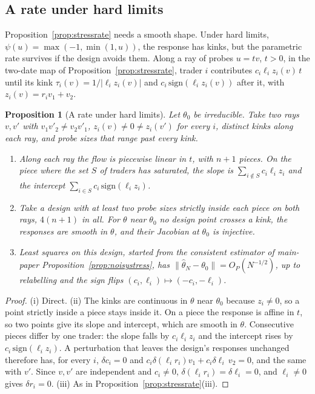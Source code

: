 \documentclass[12pt]{article}
\newtheorem{proposition}[theorem]{Proposition}
\theoremstyle{definition}
\theoremstyle{remark}
\begin{document}
\subsection{A rate under hard limits}

Proposition~\ref{prop:stressrate} needs a smooth shape. Under hard limits, $\psi(u)=\max(-1,\min(1,u))$, the response has kinks, but the parametric rate survives if the design avoids them. Along a ray of probes $u=tv$, $t>0$, in the two-date map of Proposition~\ref{prop:stressrate}, trader $i$ contributes $c_i\ell_iz_i(v)\,t$ until its kink $\tau_i(v)=1/|\ell_iz_i(v)|$ and $c_i\,\mathrm{sign}(\ell_iz_i(v))$ after it, with $z_i(v)=r_iv_1+v_2$.

\begin{proposition}[A rate under hard limits]\label{prop:hardrate}
Let $\theta_0$ be irreducible. Take two rays $v,v'$ with $v_1v'_2\ne v_2v'_1$, $z_i(v)\ne0\ne z_i(v')$ for every $i$, distinct kinks along each ray, and probe sizes that range past every kink.
\begin{enumerate}[label=(\roman*),itemsep=1pt]
\item Along each ray the flow is piecewise linear in $t$, with $n+1$ pieces. On the piece where the set $S$ of traders has saturated, the slope is $\sum_{i\notin S}c_i\ell_iz_i$ and the intercept $\sum_{i\in S}c_i\,\mathrm{sign}(\ell_iz_i)$.
\item Take a design with at least two probe sizes strictly inside each piece on both rays, $4(n+1)$ in all. For $\theta$ near $\theta_0$ no design point crosses a kink, the responses are smooth in $\theta$, and their Jacobian at $\theta_0$ is injective.
\item Least squares on this design, started from the consistent estimator of main-paper Proposition~\ref{prop:noisystress}, has $\|\hat\theta_N-\theta_0\|=O_P(N^{-1/2})$, up to relabelling and the sign flips $(c_i,\ell_i)\mapsto(-c_i,-\ell_i)$.
\end{enumerate}
\end{proposition}

\begin{proof}
(i) Direct. (ii) The kinks are continuous in $\theta$ near $\theta_0$ because $z_i\ne0$, so a point strictly inside a piece stays inside it. On a piece the response is affine in $t$, so two points give its slope and intercept, which are smooth in $\theta$. Consecutive pieces differ by one trader: the slope falls by $c_i\ell_iz_i$ and the intercept rises by $c_i\,\mathrm{sign}(\ell_iz_i)$. A perturbation that leaves the design's responses unchanged therefore has, for every $i$, $\delta c_i=0$ and $c_i\delta(\ell_ir_i)v_1+c_i\delta\ell_i\,v_2=0$, and the same with $v'$. Since $v,v'$ are independent and $c_i\ne0$, $\delta(\ell_ir_i)=\delta\ell_i=0$, and $\ell_i\ne0$ gives $\delta r_i=0$. (iii) As in Proposition~\ref{prop:stressrate}(iii).
\end{proof}
\end{document}
